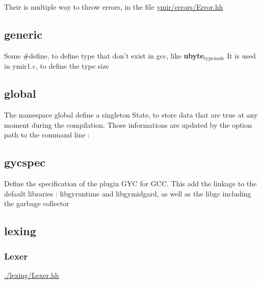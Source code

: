 \documentclass[11pt]{article}
\begin{document}
Their is multiple way to throw errors, in the file \href{./errors/Error.hh}{ymir/errors/Error.hh} 

\subsection*{generic}
\label{sec:orge1f737a}

Some \#define, to define type that don't exist in gcc, like \textbf{ubyte\(_{\text{type}}\)\(_{\text{node}}\)}
It is used in ymir1.c, to define the type size 

\subsection*{global}
\label{sec:orgb84d0d3}

The namespace global define a singleton State, to store data that are true at any moment during the compilation.
Those informations are updated by the option path to the command line : 

\subsection*{gycspec}
\label{sec:org643496d}

Define the specification of the plugin GYC for GCC.
This add the
linkage to the default libraries : libgyruntime and libgymidgard,
as well as the libgc including the garbage collector

\subsection*{lexing}
\label{sec:org76b4c8f}

\subsubsection*{Lexer}
\label{sec:org9325d3a}
\url{./lexing/Lexer.hh}
\end{document}
